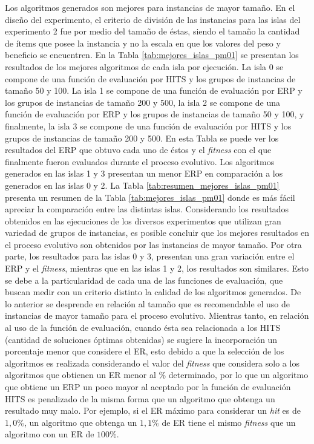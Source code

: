 Los algoritmos generados son mejores para instancias de mayor tamaño. En el diseño del experimento, el criterio de división de las instancias para las islas del experimento 2 fue por medio del tamaño de éstas, siendo el tamaño la cantidad de ítems que posee la instancia y no la escala en que los valores del peso y beneficio se encuentren. En la Tabla \ref{tab:mejores_islas_pm01} se presentan los resultados de los mejores algoritmos de cada isla por ejecución. La isla 0 se compone de una función de evaluación por HITS y los grupos de instancias de tamaño 50 y 100. La isla 1 se compone de una función de evaluación por ERP y los grupos de instancias de tamaño 200 y 500, la isla 2 se compone de una función de evaluación por ERP y los grupos de instancias de tamaño 50 y 100, y finalmente, la isla 3 se compone de una función de evaluación por HITS y los grupos de instancias de tamaño 200 y 500. En esta Tabla se puede ver los resultados del ERP que obtuvo cada uno de éstos y el \textit{fitness} con el que finalmente fueron evaluados durante el proceso evolutivo. Los algoritmos generados en las islas 1 y 3 presentan un menor ERP en comparación a los generados en las islas 0 y 2. La Tabla \ref{tab:resumen_mejores_islas_pm01} presenta un resumen de la Tabla \ref{tab:mejores_islas_pm01} donde es más fácil apreciar la comparación entre las distintas islas. Considerando los resultados obtenidos en las ejecuciones de los diversos experimentos que utilizan gran variedad de grupos de instancias, es posible concluir que los mejores resultados en el proceso evolutivo son obtenidos por las instancias de mayor tamaño. Por otra parte, los resultados para las islas 0 y 3, presentan una gran variación entre el ERP y el \textit{fitness}, mientras que en las islas 1 y 2, los resultados son similares. Esto se debe a la particularidad de cada una de las funciones de evaluación, que buscan medir con un criterio distinto la calidad de los algoritmos generados. De lo anterior se desprende en relación al tamaño que es recomendable el uso de instancias de mayor tamaño para el proceso evolutivo. Mientras tanto, en relación al uso de la función de evaluación, cuando ésta sea relacionada a los HITS (cantidad de soluciones óptimas obtenidas) se sugiere la incorporación un porcentaje menor que considere el ER, esto debido a que la selección de los algoritmos es realizada considerando el valor del \textit{fitness} que considera solo a los algoritmos que obtienen un ER menor al \% determinado, por lo que un algoritmo que obtiene un ERP un poco mayor al aceptado por la función de evaluación HITS es penalizado de la misma forma que un algoritmo que obtenga un resultado muy malo. Por ejemplo, si el ER máximo para considerar un \textit{hit} es de $1,0\%$, un algoritmo que obtenga un $1,1\%$ de ER tiene el mismo \textit{fitness} que un algoritmo con un ER de $100\%$.

